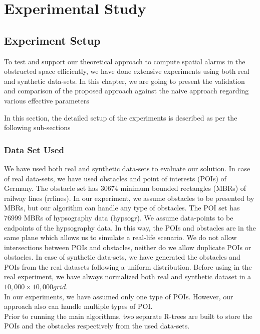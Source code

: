 \chapter{Experimental Study}
\section{\label{sec:exp}Experiment Setup}
\label{sec:exp}
To test and support our theoretical approach to compute spatial alarms in the obstructed space efficiently, we have done extensive experiments using both real and synthetic data-sets. In this chapter, we are going to present the validation and comparison of the proposed approach against the naive approach regarding various effective parameters

In this section, the detailed setup of the experiments is described as per the following sub-sections
\subsection{Data Set Used}

We have used both real and synthetic data-sets to evaluate our solution. In case of real data-sets, we have used obstacles and point of interests (POIs) of Germany. The obstacle set has 30674 minimum bounded rectangles (MBRs) of railway lines (rrlines). In our experiment, we assume obstacles to be presented by MBRs, but our algorithm can handle any type of obstacles. The POI set has 76999 MBRs of hypsography data (hypsogr). We assume data-points to be endpoints of the hypsography data. In this way, the POIs and obstacles are in the same plane which allows us to simulate a real-life scenario. We do not allow intersections between POIs and obstacles, neither do we allow duplicate POIs or obstacles. In case of synthetic data-sets, we have generated the obstacles and POIs from the real datasets following a uniform distribution. Before using in the real experiment, we have always normalized both real and synthetic dataset in a $  10,000 \times 10,000 grid$.\\
In our experiments, we have assumed only one type of POIs. However, our approach also can handle multiple types of POI. \\
Prior to  running the main algorithms, two separate R-trees are built to store the POIs and the obstacles respectively from the used data-sets.\\





